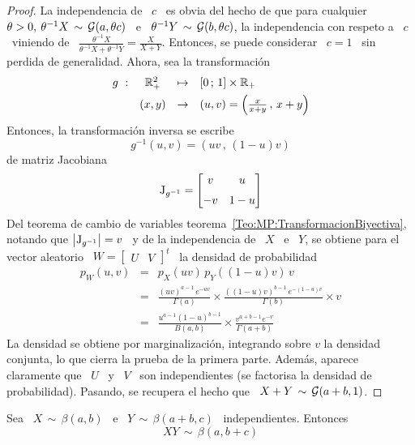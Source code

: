 \begin{proof}
  La independencia de \ $c$ \ es obvia del hecho de que para cualquier $\theta >
  0, \: \theta^{-1} X \, \sim \, \mathcal{G}(a,\theta c)$ \ e \ $\theta^{-1} Y \, \sim \,
  \mathcal{G}(b,\theta  c)$,  la independencia  con  respeto  a \  $c$  \  viniendo de  \
  $\frac{\theta^{-1}     X}{\theta^{-1}     X     +     \theta^{-1}     Y}     =
  \frac{X}{X+Y}$.  Entonces, se  puede considerar  \ $c  = 1$  \ sin  perdida de
  generalidad. Ahora, sea la transformaci\'on
  \[
  \begin{array}{lccl}
    g\ : & \mathbb{R}_+^2 & \mapsto & [0 \, ; \, 1] \times \mathbb{R}_+\\[1.5mm]
    & (x,y) & \to & (u,v) = \left( \frac{x}{x+y} \, , \, x+y \right)
  \end{array}
  \]
  Entonces, la transformaci\'on inversa se escribe
  \[
  g^{-1}(u,v) = \left( u v \, , \, (1-u) v \right)
  \]
  de matriz Jacobiana
  \[
  \operatorname{J}_{g^{-1}} = \begin{bmatrix} v & u \\[2mm] -v & 1-u \end{bmatrix}
  \]
  Del          teorema          de          cambio         de          variables
  teorema~\ref{Teo:MP:TransformacionBiyectiva},      notando     que     $\left|
    \operatorname{J}_{g^{-1}} \right| =  v$ \ y de la  independencia de \ $X$ \ e  \ $Y$, se
  obtiene para el vector aleatorio \ $W = \begin{bmatrix} U & V \end{bmatrix}^t$
  \ la densidad de probabilidad
  \begin{eqnarray*}
    p_W(u,v) & = & p_X( u v ) \, p_Y( (1-u) v ) \, v\\[2mm]
    & = & \frac{\left( u v \right)^{a-1} \, e^{- u v}}{\Gamma(a)} \times
    \frac{\left( (1-u) v \right)^{b-1} \, e^{- (1-u) v}}{\Gamma(b)} \times v\\[2mm]
    & = & \frac{u^{a-1} (1-u)^{b-1}}{B(a,b)} \times \frac{v^{a+b-1} e^{-v}}{\Gamma(a+b)}
  \end{eqnarray*}
  La  densidad se  obtiene por  marginalizaci\'on, \ie  integrando sobre  $v$ la
  densidad conjunta,  lo que  cierra la prueba  de la primera  parte.  Adem\'as,
  aparece claramente que \  $U$ \ y \ $V$ \ son  independientes (se factorisa la
  densidad de probabilidad).   Pasando, se recupera el hecho que  \ $X+Y \, \sim
  \, \mathcal{G}(a+b,1)$.
\end{proof}
%
\begin{lema}
\label{Lem:StabilidadBeta}
%
  Sea  \  $X \,  \sim  \, \beta(a,b)$  \  e  \ $Y  \,  \sim  \, \beta(a+b,c)$  \
  independientes. Entonces
  \[
  X Y \, \sim \, \beta(a,b+c)
  \]
\end{lema}
